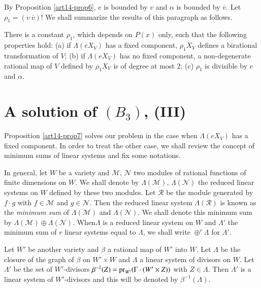 By Proposition \ref{art14-prop6}, $e$ is bounded by $v$ and $\alpha$ is bounded by $\overline{v}$. Let $\rho_{1}=(v \ \overline{v})$! We shall summarize the results of this paragraph as follows.

\begin{proposition}\label{art14-prop7}
There is a constant $\rho_{1}$, which depends on $P(x)$ only, such that the following properties hold: {\rm(a)} if $\Lambda(eX_{V})$ has a fixed component, $\rho_{1}X_{V}$ defines a birational transformation of $V$; {\rm(b)} if $\Lambda(eX_{V})$ has no fixed component, a non-degenerate rational map of $V$ defined by $\rho_{1}X_{V}$ is of degree at most $2$; {\rm(c)} $\rho_{1}$ is divisible by $e$ and $\alpha$.
\end{proposition}

\section{A solution of $(B_{3})$, (III)}\label{art14-sec7}

Proposition \ref{art14-prop7} solves our problem in the case when $\Lambda(eX_{V})$ has a fixed component. In order to treat the other case, we shall review the concept of minimum sums of linear systems and fix some notations.

In general, let $W$ be a variety and $\mathscr{M}$, $\mathscr{N}$ two modules of rational functions of finite dimensions on $W$. We shall denote by $\Lambda(\mathscr{M})$, $\Lambda(\mathscr{N})$ the reduced linear systems on $W$ defined by these two modules. Let $\mathscr{R}$ be the module generated by $f\cdot g$ with $f\in \mathscr{M}$ and $g\in \mathscr{N}$. Then the reduced linear system $\Lambda(\mathscr{R})$ is known as the {\em minimum sum} of $\Lambda(\mathscr{M})$ and $\Lambda(\mathscr{N})$. We shall denote this minimum sum by $\Lambda(\mathscr{M})\oplus \Lambda(\mathscr{N})$. When\pageoriginale $\Lambda$ is a reduced linear system on $W$ and $\Lambda'$ the minimum sum of $r$ linear systems equal to $\Lambda$, we shall write $\oplus^{r}\Lambda$ for $\Lambda'$.

Let $W'$ be another variety and $\beta$ a rational map of $W'$ into $W$. Let $\Lambda$ be the closure of the graph of $\beta$ on $W'\times W$ and $\Lambda$ a linear system of divisors on $W$. Let $\Lambda'$ be the set of $W'$-divisors $\beta^{-1}(Z)=\operatorname{\mathrm{pr}}_{W'}(\Gamma\cdot (W'\times Z))$ with $Z\in \Lambda$. Then $\Lambda'$ is a linear system of $W'$-divisors and this will be denoted by $\beta^{-1}(\Lambda)$.

